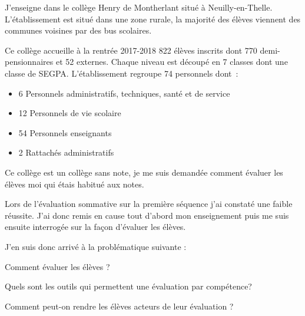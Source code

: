 

J'enseigne dans le collège Henry de Montherlant situé à Neuilly-en-Thelle.
L'établissement est situé dans une zone rurale, la majorité des élèves viennent des communes voisines par des bus scolaires.

Ce collège accueille à la rentrée 2017-2018 822 élèves inscrits dont 770 demi-pensionnaires et 52 externes.
Chaque niveau est découpé en 7 classes dont une classe de SEGPA.
L'établissement regroupe 74 personnels dont~:
\begin{itemize}
\item 6 Personnels administratifs, techniques, santé et de service
\item 12 Personnels de vie scolaire
\item 54 Personnels enseignants
\item 2 Rattachés administratifs
\end{itemize}

Ce collège est un collège sans note, je me suis demandée comment évaluer les élèves moi qui étais habitué aux notes.

Lors de l'évaluation sommative sur la première séquence j'ai constaté une faible réussite.
J'ai donc remis en cause tout d'abord mon enseignement puis me suis ensuite interrogée sur la façon d'évaluer les élèves.

J'en suis donc arrivé à la problématique suivante : 

Comment évaluer les élèves ?

Quels sont les outils qui permettent une évaluation par compétence?

Comment peut-on rendre les élèves acteurs de leur évaluation ?

